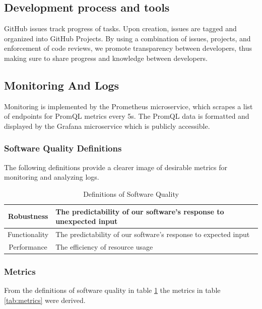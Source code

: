 \subsection{Development process and tools}
\label{subsec:process&tools}
GitHub issues track progress of tasks. Upon creation, issues are tagged and organized into GitHub Projects. By using a combination of issues, projects, and enforcement of code reviews, we promote transparency between developers, thus making sure to share progress and knowledge between developers.

\subsection{Monitoring And Logs}
\label{subsec:monitoring}
Monitoring is implemented by the Prometheus microservice, which scrapes a list of endpoints for PromQL metrics every 5s.
The PromQL data is formatted and displayed by the Grafana microservice which is publicly accessible.
\subsubsection{Software Quality Definitions}
\label{subsubsec:software_quality_definitions}
The following definitions provide a clearer image of desirable metrics for monitoring \mini and analyzing logs.
\begin{table}[H]
    \centering
    \begin{tabular}{|c|p{6cm}|}\hline
        Robustness & The predictability of our software's response to unexpected input  \\\hline
        Functionality & The predictability of our software's response to expected input \\\hline
        Performance & The efficiency of resource usage \\ \hline
    \end{tabular}
    \caption{Definitions of Software Quality}
    \label{tab:software_quality}
\end{table}

\subsubsection{Metrics}
From the definitions of software quality in table \ref{tab:software_quality} the metrics in table \ref{tab:metrics} were derived.


